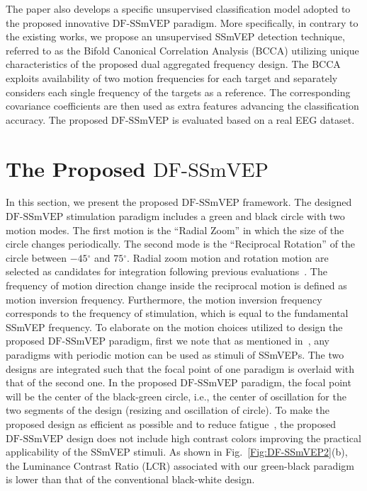 \documentclass[sensors,accept,moreauthors,pdftex,10pt,a4paper]{mdpi}
\def\DFS{\text{DF-SSmVEP}} %
\def\DCCA{\text{BCCA}}
\theoremstyle{mdpi}
\newcounter{ex}
\newcounter{re}
\theoremstyle{mdpidefinition}
\begin{document}
The paper also develops a specific unsupervised classification model adopted to the proposed innovative $\DFS$ paradigm. More specifically, in contrary to the existing works, we propose an unsupervised SSmVEP detection technique, referred to as the Bifold Canonical Correlation Analysis ($\DCCA$) utilizing unique characteristics of the proposed dual aggregated frequency design. The $\DCCA$ exploits  availability of two motion  frequencies for each target and separately considers each single frequency of the targets as a reference. The corresponding covariance coefficients are then used as extra features advancing the classification accuracy. The proposed $\DFS$ is evaluated based on a real EEG dataset.

\section{The Proposed $\DFS$}
In this section, we present the proposed $\DFS$ framework. The designed $\DFS$ stimulation paradigm includes a green and black circle with two motion modes. The first motion is the ``Radial Zoom'' in which the size of the circle changes periodically. The second mode is the ``Reciprocal Rotation'' of the circle between  $-45$$^\circ$ and $75$$^\circ$. Radial zoom motion and rotation motion are selected as candidates for integration following previous evaluations~\cite{yan2017four, chai2019radial}. The frequency of motion direction change inside the reciprocal motion is defined as motion inversion frequency. Furthermore, the motion inversion frequency corresponds to the frequency of stimulation, which is equal to the fundamental SSmVEP frequency. To elaborate on the motion choices utilized to design the proposed $\DFS$ paradigm, first we note that as mentioned in~\cite{yan2017four}, any paradigms with periodic motion can be used as stimuli of SSmVEPs. The two designs are integrated such that the focal point of one paradigm is overlaid with that  of the second one. In the proposed $\DFS$ paradigm, the focal point will be the center of the black-green circle, i.e., the center of oscillation for the two segments of the design (resizing and oscillation of circle).  To make the proposed design as efficient as possible and to  reduce fatigue~\cite{nakanishi2013approximation}, the proposed $\DFS$ design does not include high contrast colors improving the practical applicability of the SSmVEP stimuli.  As shown in Fig.~\ref{Fig:DF-SSmVEP2}(b), the Luminance Contrast Ratio (LCR) associated with our green-black paradigm is lower than that of the conventional black-white design.
\end{document}
